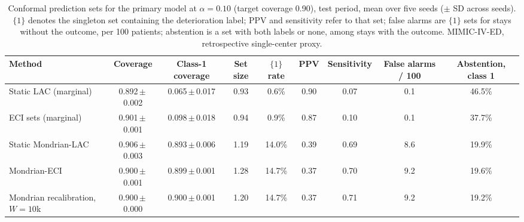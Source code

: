 \begin{table}[t]
\centering
\caption{Conformal prediction sets for the primary model at $\alpha = 0.10$ (target coverage 0.90), test period, mean over five seeds ($\pm$ SD across seeds). $\{1\}$ denotes the singleton set containing the deterioration label; PPV and sensitivity refer to that set; false alarms are $\{1\}$ sets for stays without the outcome, per 100 patients; abstention is a set with both labels or none, among stays with the outcome. MIMIC-IV-ED, retrospective single-center proxy.}
\label{tab:conformal}
\begin{tabular}{lcccccccc}
\toprule
Method & Coverage & Class-1 coverage & Set size & $\{1\}$ rate & PPV & Sensitivity & False alarms / 100 & Abstention, class 1 \\
\midrule
Static LAC (marginal) & 0.892\,$\pm$\,0.002 & 0.065\,$\pm$\,0.017 & 0.93 & 0.6\% & 0.90 & 0.07 & 0.1 & 46.5\% \\
ECI sets (marginal) & 0.901\,$\pm$\,0.001 & 0.098\,$\pm$\,0.018 & 0.94 & 0.9\% & 0.87 & 0.10 & 0.1 & 37.7\% \\
Static Mondrian-LAC & 0.906\,$\pm$\,0.003 & 0.893\,$\pm$\,0.006 & 1.19 & 14.0\% & 0.39 & 0.69 & 8.6 & 19.9\% \\
Mondrian-ECI & 0.900\,$\pm$\,0.001 & 0.899\,$\pm$\,0.001 & 1.28 & 14.7\% & 0.37 & 0.70 & 9.2 & 19.6\% \\
Mondrian recalibration, $W = 10$k & 0.900\,$\pm$\,0.000 & 0.900\,$\pm$\,0.001 & 1.20 & 14.7\% & 0.37 & 0.71 & 9.2 & 19.2\% \\
\bottomrule
\end{tabular}
\end{table}
